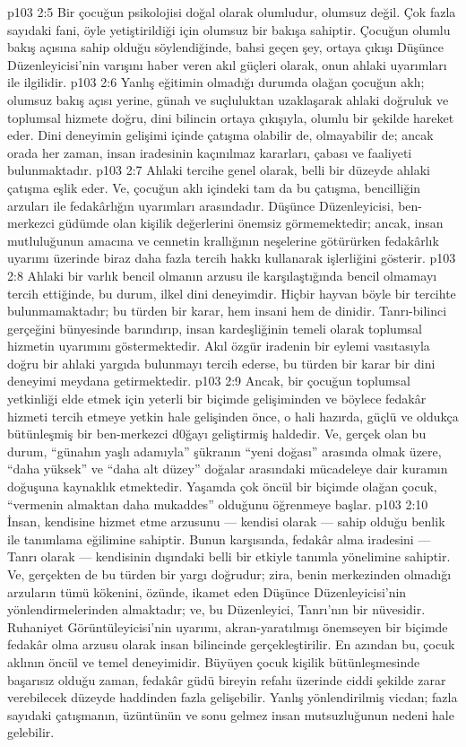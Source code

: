 \vs p103 2:5 Bir çocuğun psikolojisi doğal olarak olumludur, olumsuz değil. Çok fazla sayıdaki fani, öyle yetiştirildiği için olumsuz bir bakışa sahiptir. Çocuğun olumlu bakış açısına sahip olduğu söylendiğinde, bahsi geçen şey, ortaya çıkışı Düşünce Düzenleyicisi’nin varışını haber veren akıl güçleri olarak, onun ahlaki uyarımları ile ilgilidir.
\vs p103 2:6 Yanlış eğitimin olmadığı durumda olağan çocuğun aklı; olumsuz bakış açısı yerine, günah ve suçluluktan uzaklaşarak ahlaki doğruluk ve toplumsal hizmete doğru, dini bilincin ortaya çıkışıyla, olumlu bir şekilde hareket eder. Dini deneyimin gelişimi içinde çatışma olabilir de, olmayabilir de; ancak orada her zaman, insan iradesinin kaçınılmaz kararları, çabası ve faaliyeti bulunmaktadır.
\vs p103 2:7 Ahlaki tercihe genel olarak, belli bir düzeyde ahlaki çatışma eşlik eder. Ve, çocuğun aklı içindeki tam da bu çatışma, bencilliğin arzuları ile fedakârlığın uyarımları arasındadır. Düşünce Düzenleyicisi, ben\hyp{}merkezci güdümde olan kişilik değerlerini önemsiz görmemektedir; ancak, insan mutluluğunun amacına ve cennetin krallığının neşelerine götürürken fedakârlık uyarımı üzerinde biraz daha fazla tercih hakkı kullanarak işlerliğini gösterir.
\vs p103 2:8 Ahlaki bir varlık bencil olmanın arzusu ile karşılaştığında bencil olmamayı tercih ettiğinde, bu durum, ilkel dini deneyimdir. Hiçbir hayvan böyle bir tercihte bulunmamaktadır; bu türden bir karar, hem insani hem de dinidir. Tanrı\hyp{}bilinci gerçeğini bünyesinde barındırıp, insan kardeşliğinin temeli olarak toplumsal hizmetin uyarımını göstermektedir. Akıl özgür iradenin bir eylemi vasıtasıyla doğru bir ahlaki yargıda bulunmayı tercih ederse, bu türden bir karar bir dini deneyimi meydana getirmektedir.
\vs p103 2:9 Ancak, bir çocuğun toplumsal yetkinliği elde etmek için yeterli bir biçimde gelişiminden ve böylece fedakâr hizmeti tercih etmeye yetkin hale gelişinden önce, o hali hazırda, güçlü ve oldukça bütünleşmiş bir ben\hyp{}merkezci d0ğayı geliştirmiş haldedir. Ve, gerçek olan bu durum, “günahın yaşlı adamıyla” şükranın “yeni doğası” arasında olmak üzere, “daha yüksek” ve “daha alt düzey” doğalar arasındaki mücadeleye dair kuramın doğuşuna kaynaklık etmektedir. Yaşamda çok öncül bir biçimde olağan çocuk, “vermenin almaktan daha mukaddes” olduğunu öğrenmeye başlar.
\vs p103 2:10 İnsan, kendisine hizmet etme arzusunu --- kendisi olarak --- sahip olduğu benlik ile tanımlama eğilimine sahiptir. Bunun karşısında, fedakâr alma iradesini --- Tanrı olarak --- kendisinin dışındaki belli bir etkiyle tanımla yönelimine sahiptir. Ve, gerçekten de bu türden bir yargı doğrudur; zira, benin merkezinden olmadığı arzuların tümü kökenini, özünde, ikamet eden Düşünce Düzenleyicisi’nin yönlendirmelerinden almaktadır; ve, bu Düzenleyici, Tanrı’nın bir nüvesidir. Ruhaniyet Görüntüleyicisi’nin uyarımı, akran\hyp{}yaratılmışı önemseyen bir biçimde fedakâr olma arzusu olarak insan bilincinde gerçekleştirilir. En azından bu, çocuk aklının öncül ve temel deneyimidir. Büyüyen çocuk kişilik bütünleşmesinde başarısız olduğu zaman, fedakâr güdü bireyin refahı üzerinde ciddi şekilde zarar verebilecek düzeyde haddinden fazla gelişebilir. Yanlış yönlendirilmiş vicdan; fazla sayıdaki çatışmanın, üzüntünün ve sonu gelmez insan mutsuzluğunun nedeni hale gelebilir.
